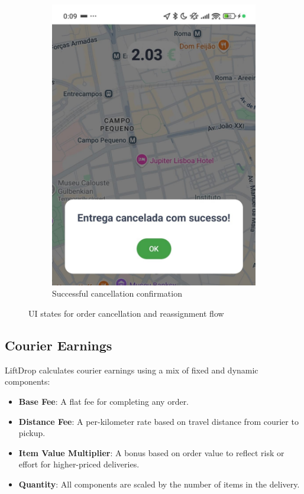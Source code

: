 \begin{figure}[H]
\begin{subfigure}[b]{0.47\textwidth}
        \includegraphics[width=\textwidth]{images/CancelSuccess.jpeg}
        \caption{Successful cancellation confirmation}
        \label{fig:cancel_success}
    \end{subfigure}

    \caption{UI states for order cancellation and reassignment flow}
    \label{fig:cancel_and_reassign_flow}
\end{figure}

\newpage

\subsection{Courier Earnings}

LiftDrop calculates courier earnings using a mix of fixed and dynamic components:

\begin{itemize}
    \item \textbf{Base Fee}: A flat fee for completing any order.
    \item \textbf{Distance Fee}: A per-kilometer rate based on travel distance from courier to pickup.
    \item \textbf{Item Value Multiplier}: A bonus based on order value to reflect risk or effort for higher-priced deliveries.
    \item \textbf{Quantity}: All components are scaled by the number of items in the delivery.
\end{itemize}

